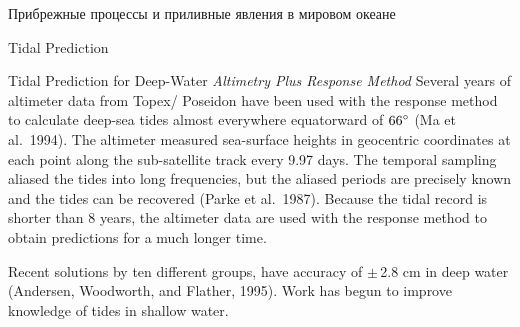 \begin{chapter}{Прибрежные процессы и приливные явления в мировом океане}
\begin{section}{Tidal Prediction}
\begin{paragraph}{Tidal Prediction for Deep-Water}
\textit{Altimetry Plus Response Method} Several years of altimeter
data from 
Topex/ Poseidon have been used with the response
method to calculate deep-sea tides almost everywhere equatorward of
${66}^\circ$ (Ma et al.\ 1994). The altimeter measured sea-surface
heights in geocentric coordinates at each point along the
sub-satellite track every 9.97 days. The temporal sampling aliased the
tides into long frequencies, but the aliased periods are precisely
known and the tides can be recovered (Parke et al.\ 1987).  Because
the tidal record is shorter than 8 years, the altimeter data are used
with the response method to obtain predictions for a much longer time.
%

Recent solutions by ten different groups, have
accuracy of $\pm \, $2.8 cm in deep water
(Andersen, Woodworth, and Flather, 1995). Work has begun to improve
knowledge of tides in shallow water.
%


\end{paragraph}
\end{section}
\end{chapter}
